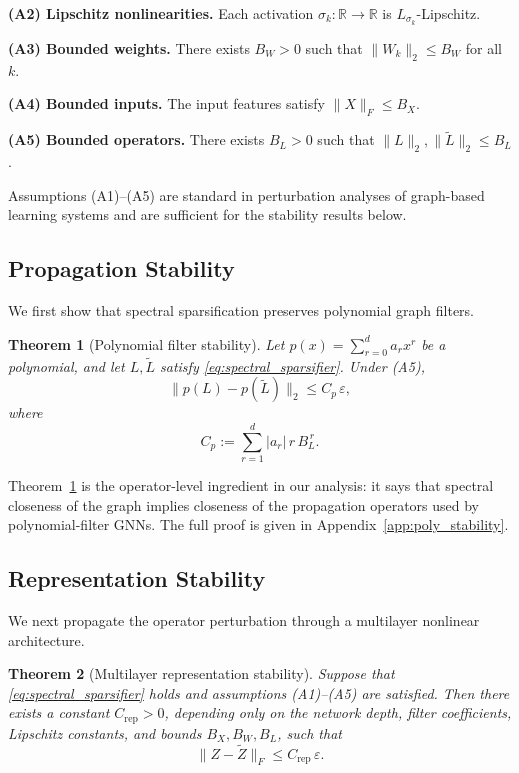 \documentclass{article}
\newtheorem{theorem}{Theorem}
\begin{document}
\textbf{(A2) Lipschitz nonlinearities.}
Each activation $\sigma_k:\mathbb{R}\to\mathbb{R}$ is $L_{\sigma_k}$-Lipschitz.

\textbf{(A3) Bounded weights.}
There exists $B_W>0$ such that $\|W_k\|_2 \le B_W$ for all $k$.

\textbf{(A4) Bounded inputs.}
The input features satisfy $\|X\|_F \le B_X$.

\textbf{(A5) Bounded operators.}
There exists $B_L>0$ such that $\|L\|_2,\|\widetilde L\|_2 \le B_L$.

Assumptions (A1)--(A5) are standard in perturbation analyses of graph-based learning systems and are sufficient for the stability results below.

\subsection{Propagation Stability}

We first show that spectral sparsification preserves polynomial graph filters.

\begin{theorem}[Polynomial filter stability]
\label{thm:poly_stability}
Let $p(x)=\sum_{r=0}^{d} a_r x^r$ be a polynomial, and let $L,\widetilde L$ satisfy \eqref{eq:spectral_sparsifier}. Under (A5),
\begin{equation}
\|p(L)-p(\widetilde L)\|_2 \le C_p\,\varepsilon,
\label{eq:poly_stability}
\end{equation}
where
\[
C_p := \sum_{r=1}^{d} |a_r|\, r\, B_L^{\,r}.
\]
\end{theorem}

Theorem~\ref{thm:poly_stability} is the operator-level ingredient in our analysis: it says that spectral closeness of the graph implies closeness of the propagation operators used by polynomial-filter GNNs. The full proof is given in Appendix~\ref{app:poly_stability}.

\subsection{Representation Stability}

We next propagate the operator perturbation through a multilayer nonlinear architecture.

\begin{theorem}[Multilayer representation stability]
\label{thm:multilayer_stability}
Suppose that \eqref{eq:spectral_sparsifier} holds and assumptions (A1)--(A5) are satisfied. Then there exists a constant $C_{\mathrm{rep}}>0$, depending only on the network depth, filter coefficients, Lipschitz constants, and bounds $B_X,B_W,B_L$, such that
\begin{equation}
\|Z-\widetilde Z\|_F \le C_{\mathrm{rep}}\,\varepsilon.
\label{eq:multilayer_stability}
\end{equation}
\end{theorem}
\end{document}

